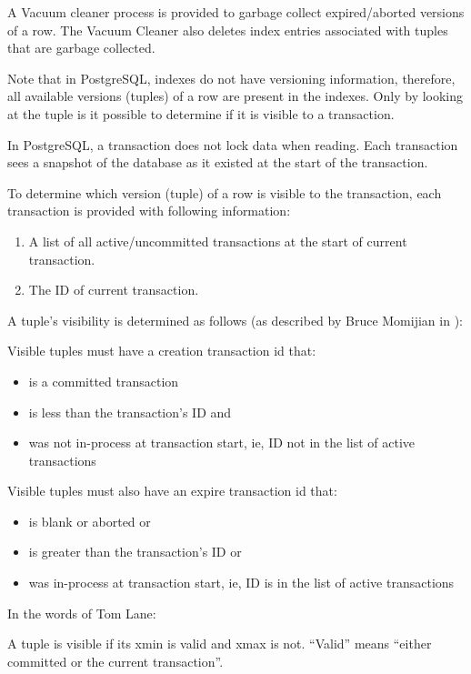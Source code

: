 \documentclass{article}
\begin{document}
A Vacuum cleaner process is provided to garbage collect
expired/aborted versions of a row. The Vacuum Cleaner also deletes
index entries associated with tuples that are garbage collected.

Note that in PostgreSQL, indexes do not have versioning information,
therefore, all available versions (tuples) of a row are present in
the indexes. Only by looking at the tuple is it possible to
determine if it is visible to a transaction.

In PostgreSQL, a transaction does not lock data when reading. Each
transaction sees a snapshot of the database as it existed at the
start of the transaction.

To determine which version (tuple) of a row is visible to the
transaction, each transaction is provided with following
information:

\begin{enumerate}
\item A list of all active/uncommitted transactions at the start
of current transaction.
\item The ID of current transaction.
\end{enumerate}

A tuple's visibility is determined as follows (as described by Bruce
Momijian in \cite{bm}):

Visible tuples must have a creation transaction id that:
\begin{itemize}
\item is a committed transaction
\item is less than the transaction's ID and
\item was not in-process at transaction start, ie, ID not in the list of
active transactions
\end{itemize}

Visible tuples must also have an expire transaction id that:
\begin{itemize}
\item is blank or aborted or
\item is greater than the transaction's ID or
\item was in-process at transaction start, ie, ID is in the list of
active transactions
\end{itemize}

In the words of Tom Lane:

A tuple is visible if its xmin is valid and xmax is not. ``Valid''
means ``either committed or the current transaction''.
\end{document}
